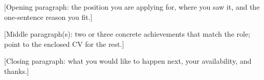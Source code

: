\documentclass[11pt,a4paper,sans]{moderncv} %
\date{\today} %
\begin{document}
\makelettertitle %


[Opening paragraph: the position you are applying for, where you saw it, and the one-sentence reason you fit.]

[Middle paragraph(s): two or three concrete achievements that match the role; point to the enclosed CV for the rest.]

[Closing paragraph: what you would like to happen next, your availability, and thanks.]

\makeletterclosing %
\end{document}
